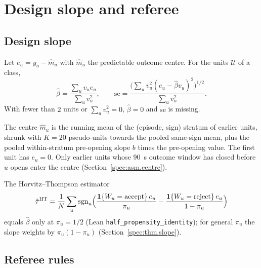 \section{Design slope and referee}
\label{spec:ref}

\subsection{Design slope}
\label{spec:ref.slope}

\begin{definition}
Let $e_u = y_u - \hat m_u$ with $\hat m_u$ the predictable outcome centre. For the units $\mathcal{U}$ of a class,
\begin{equation*}
\hat\beta = \frac{\sum_u v_u e_u}{\sum_u v_u^2}, \qquad
\mathrm{se} = \frac{\bigl(\sum_u v_u^2 (e_u - \hat\beta v_u)^2\bigr)^{1/2}}{\sum_u v_u^2}.
\end{equation*}
With fewer than $2$ units or $\sum_u v_u^2 = 0$, $\hat\beta = 0$ and $\mathrm{se}$ is missing.
\end{definition}

\noindent The centre $\hat m_u$ is the running mean of the (episode, sign) stratum of earlier units, shrunk with $K = 20$ pseudo-units towards the pooled same-sign mean, plus the pooled within-stratum pre-opening slope $b$ times the pre-opening value. The first unit has $e_u = 0$. Only earlier units whose 90~s outcome window has closed before $u$ opens enter the centre (Section~\ref{spec:asm.centre}).

The Horvitz--Thompson estimator
\begin{equation*}
\hat\tau^{\mathrm{HT}} = \frac{1}{N} \sum_u \mathrm{sgn}_u \Bigl(\frac{\mathbf{1}\{W_u = \text{accept}\}\, e_u}{\pi_u} - \frac{\mathbf{1}\{W_u = \text{reject}\}\, e_u}{1 - \pi_u}\Bigr)
\end{equation*}
equals $\hat\beta$ only at $\pi_u = 1/2$ (Lean \texttt{half\_propensity\_identity}); for general $\pi_u$ the slope weights by $\pi_u(1 - \pi_u)$ (Section~\ref{spec:thm.slope}).


\subsection{Referee rules}
\label{spec:ref.rules}

